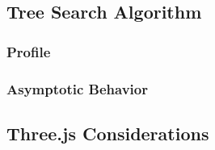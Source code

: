 \documentclass{article}
\begin{document}
        \subsection{Tree Search Algorithm}
            \subsubsection{Profile}
            \subsubsection{Asymptotic Behavior}
        \subsection{Three.js Considerations}


    \nocite{*}
    
\end{document}
